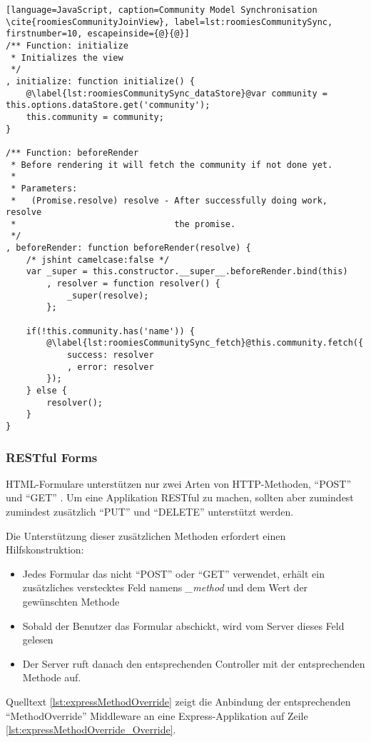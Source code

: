 \begin{lstlisting}[language=JavaScript, caption=Community Model Synchronisation \cite{roomiesCommunityJoinView}, label=lst:roomiesCommunitySync, firstnumber=10, escapeinside={@}{@}]
/** Function: initialize
 * Initializes the view
 */
, initialize: function initialize() {
	@\label{lst:roomiesCommunitySync_dataStore}@var community = this.options.dataStore.get('community');
	this.community = community;
}

/** Function: beforeRender
 * Before rendering it will fetch the community if not done yet.
 *
 * Parameters:
 *   (Promise.resolve) resolve - After successfully doing work, resolve
 *                               the promise.
 */
, beforeRender: function beforeRender(resolve) {
	/* jshint camelcase:false */
	var _super = this.constructor.__super__.beforeRender.bind(this)
		, resolver = function resolver() {
			_super(resolve);
		};

	if(!this.community.has('name')) {
		@\label{lst:roomiesCommunitySync_fetch}@this.community.fetch({
			success: resolver
			, error: resolver
		});
	} else {
		resolver();
	}
}
\end{lstlisting}

\subsubsection*{\gls{RESTful} Forms}
HTML-Formulare unterstützen nur zwei Arten von HTTP-Methoden, ``POST'' und ``GET'' \cite{FormMethodMDN}. Um eine Applikation \gls{RESTful} zu machen, sollten aber zumindest zumindest zusätzlich ``PUT'' und ``DELETE'' unterstützt werden.

Die Unterstützung dieser zusätzlichen Methoden erfordert einen Hilfskonstruktion:
\begin{itemize}
	\item Jedes Formular das nicht ``POST'' oder ``GET'' verwendet, erhält ein zusätzliches verstecktes Feld namens \emph{\_method} und dem Wert der gewünschten Methode
	\item Sobald der Benutzer das Formular abschickt, wird  vom Server dieses Feld gelesen
	\item Der Server ruft danach den entsprechenden Controller mit der entsprechenden Methode auf.
\end{itemize}

Quelltext \ref{lst:expressMethodOverride} zeigt die Anbindung der entsprechenden ``MethodOverride'' Middleware \cite{methodOverrideMiddleware} an eine Express-Applikation auf Zeile \ref{lst:expressMethodOverride_Override}.

